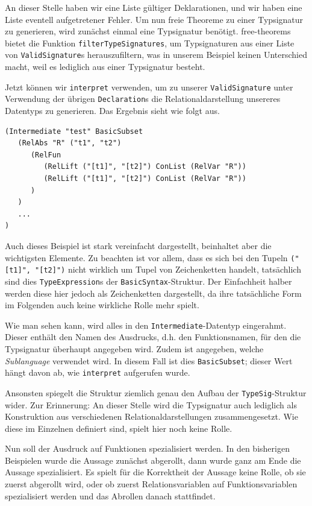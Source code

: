 An dieser Stelle haben wir eine Liste gültiger Deklarationen, und wir haben eine Liste eventell aufgetretener Fehler. Um nun
freie Theoreme zu einer Typsignatur zu generieren, wird zunächst einmal eine Typsignatur benötigt. free-theorems bietet die
Funktion \texttt{filterTypeSignatures}, um Typsignaturen aus einer Liste von \texttt{ValidSignature}s herauszufiltern, was in
unserem Beispiel keinen Unterschied macht, weil es lediglich aus einer Typsignatur besteht.

Jetzt können wir \texttt{interpret} verwenden, um zu unserer \texttt{ValidSignature} unter Verwendung der übrigen
\texttt{Declaration}s die Relationaldarstellung unsereres Datentyps zu generieren. Das Ergebnis sieht wie folgt aus.

\begin{verbatim}
(Intermediate "test" BasicSubset
   (RelAbs "R" ("t1", "t2")
      (RelFun
         (RelLift ("[t1]", "[t2]") ConList (RelVar "R"))
         (RelLift ("[t1]", "[t2]") ConList (RelVar "R"))
      )
   )
   ...
)
\end{verbatim}

Auch dieses Beispiel ist stark vereinfacht dargestellt, beinhaltet aber die wichtigsten Elemente. Zu beachten ist vor allem,
dass es sich bei den Tupeln \texttt{("[t1]", "[t2]")} nicht wirklich um Tupel von Zeichenketten handelt, tatsächlich sind dies
\texttt{TypeExpression}s der \texttt{BasicSyntax}-Struktur. Der Einfachheit halber werden diese hier jedoch als Zeichenketten
dargestellt, da ihre tatsächliche Form im Folgenden auch keine wirkliche Rolle mehr spielt.

Wie man sehen kann, wird alles in den \texttt{Intermediate}-Datentyp eingerahmt. Dieser enthält den Namen des Ausdrucks, d.h.
den Funktionsnamen, für den die Typsignatur überhaupt angegeben wird. Zudem ist angegeben, welche \textit{Sublanguage}
verwendet wird. In diesem Fall ist dies \texttt{BasicSubset}; dieser Wert hängt davon ab, wie \texttt{interpret} aufgerufen wurde.

Ansonsten spiegelt die Struktur ziemlich genau den Aufbau der \texttt{TypeSig}-Struktur wider. Zur Erinnerung: An dieser Stelle
wird die Typsignatur auch lediglich als Konstruktion aus verschiedenen Relationaldarstellungen zusammengesetzt. Wie diese
im Einzelnen definiert sind, spielt hier noch keine Rolle.

Nun soll der Ausdruck auf Funktionen spezialisiert werden. In den bisherigen Beispielen wurde die Aussage zunächst abgerollt, dann
wurde ganz am Ende die Aussage spezialisiert. Es spielt für die Korrektheit der Aussage keine Rolle, ob sie zuerst abgerollt wird, oder ob
zuerst Relationsvariablen auf Funktionsvariablen spezialisiert werden und das Abrollen danach stattfindet.

